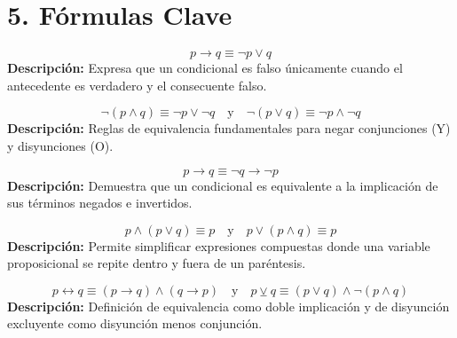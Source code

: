 \documentclass[11pt]{article}
\newenvironment{formulas}{\section*{5. Fórmulas Clave}}{}
\newcommand{\formula}[3]{\begin{tcolorbox}[colback=violet!5,colframe=violet!75!black,title=#1]\centering\[ #2 \]\tcblower\flushleft\small\textbf{Descripción:} #3\end{tcolorbox}}
\begin{document}
\begin{formulas}

  \formula{Implicación Lógica (Definición Material)}
    {p \rightarrow q \equiv \neg p \vee q}
    {Expresa que un condicional es falso únicamente cuando el antecedente es verdadero y el consecuente falso.}

  \formula{Leyes de De Morgan}
    {\neg (p \wedge q) \equiv \neg p \vee \neg q \quad \text{y} \quad \neg (p \vee q) \equiv \neg p \wedge \neg q}
    {Reglas de equivalencia fundamentales para negar conjunciones (Y) y disyunciones (O).}

  \formula{Ley de la Contrapuesta}
    {p \rightarrow q \equiv \neg q \rightarrow \neg p}
    {Demuestra que un condicional es equivalente a la implicación de sus términos negados e invertidos.}

  \formula{Leyes de Absorción}
    {p \wedge (p \vee q) \equiv p \quad \text{y} \quad p \vee (p \wedge q) \equiv p}
    {Permite simplificar expresiones compuestas donde una variable proposicional se repite dentro y fuera de un paréntesis.}

  \formula{Bicondicional y Disyunción Excluyente}
    {p \leftrightarrow q \equiv (p \rightarrow q) \wedge (q \rightarrow p) \quad \text{y} \quad p \veebar q \equiv (p \vee q) \wedge \neg(p \wedge q)}
    {Definición de equivalencia como doble implicación y de disyunción excluyente como disyunción menos conjunción.}

\end{formulas}
\end{document}
